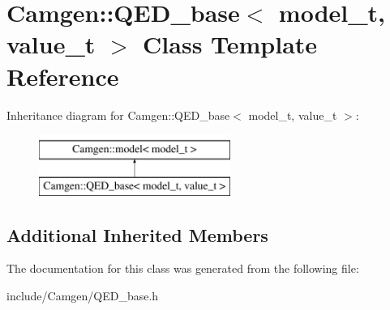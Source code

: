 \hypertarget{a00463}{}\section{Camgen\+:\+:Q\+E\+D\+\_\+base$<$ model\+\_\+t, value\+\_\+t $>$ Class Template Reference}
\label{a00463}
Inheritance diagram for Camgen\+:\+:Q\+E\+D\+\_\+base$<$ model\+\_\+t, value\+\_\+t $>$\+:\begin{figure}[H]
\begin{center}
\leavevmode
\includegraphics[height=2.000000cm]{a00463}
\end{center}
\end{figure}
\subsection*{Additional Inherited Members}


The documentation for this class was generated from the following file\+:\begin{DoxyCompactItemize}
\item 
include/\+Camgen/Q\+E\+D\+\_\+base.\+h\end{DoxyCompactItemize}
